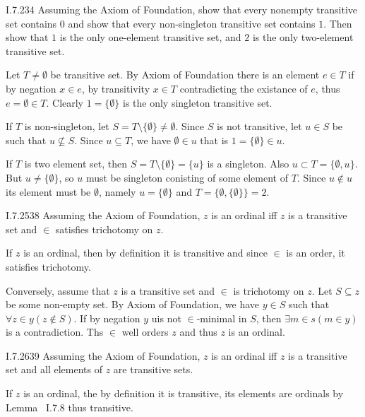 \begin{lexcopy}{I.7.2}{34}
Assuming the Axiom of Foundation, show that every 
nonempty transitive set contains $0$ and show that every non-singleton
transitive
set contains $1$. Then show that $1$ is the only one-element transitive set,
and $2$
is the only two-element transitive set.
\end{lexcopy}

Let \(T\neq\emptyset\) be transitive set.
By Axiom of Foundation there is an
element \(e\in T\) if by negation \(x\in e\),
by transitivity \(x\in T\) contradicting the existance of $e$,
thus \(e = \emptyset \in T\).
Clearly \(1= \{\emptyset\}\) is the only singleton transitive set.

If $T$ is non-singleton, let \(S = T \setminus \{\emptyset\} \neq \emptyset\).
Since $S$ is not transitive, let \(u \in S\)
be such that \(u \not\subseteq S\).
Since \(u\subseteq T\), we have \(\emptyset \in u\)
that is \(1 = \{\emptyset\} \in u\).

If $T$ is two element set,
then \(S = T \setminus \{\emptyset\}=\{u\}\) is a singleton.
Also \(u \subset T = \{\emptyset, u\}\).
But \(u \neq \{\emptyset\}\),
so $u$ must be singleton conisting of some element of $T$.
Since \(u\notin u\) its element must be \(\emptyset\),
namely \(u = \{\emptyset\}\) and
\(T = \{\emptyset, \{\emptyset\}\} = 2\).

\begin{lexcopy}{I.7.25}{38}
  Assuming the Axiom of Foundation, $z$ is an ordinal iff $z$ is
  a transitive set and \(\in\) satisfies trichotomy on $z$.
\end{lexcopy}

If $z$ is an ordinal, then by definition it is transitive
and since  \(\in\) is an order, it satisfies trichotomy.

Conversely, assume that  $z$ is  a transitive set
and \(\in\) is trichotomy on $z$.
Let \(S\subseteq z\) be some non-empty set. By Axiom of Foundation,
we have \(y \in S\) such that \(\forall z\in y (z\notin S)\).
If by negation $y$ uis not \(\in\)-minimal in $S$,
then \(\exists m\in s(m\in y)\) is a contradiction.
Ths \(\in\) well orders $z$ and thus $z$ is an ordinal.

\begin{lexcopy}{I.7.26}{39}
  Assuming the Axiom of Foundation, $z$ is an ordinal iff $z$ is
a transitive set and all elements of $z$ are transitive sets.
\end{lexcopy}

If $z$ is an ordinal, the by definition it is transitive,
its elements are ordinals by Lemma~ I.7.8 thus transitive.

